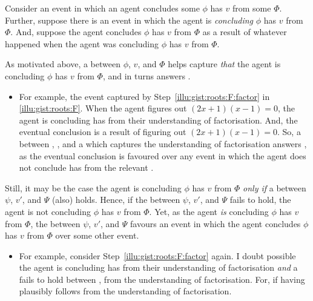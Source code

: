 \begin{note}
  Consider an event in which an agent concludes some  \(\phi\) has \val{} \(v\) from some \pool{} \(\Phi\).
  Further, suppose there is an event in which the agent is \emph{concluding} \(\phi\) has \val{} \(v\) from \(\Phi\).
  And, suppose the agent concludes \(\phi\) has \val{} \(v\) from \(\Phi\) as a result of whatever happened when the agent was concluding \(\phi\) has \val{} \(v\) from \(\Phi\).

  As motivated above, a \ros{} between \(\phi\), \(v\), and \(\Phi\) helps capture \emph{that} the agent is concluding \(\phi\) has  \(v\) from \(\Phi\), and in turns answers \qWhy{}.
  \begin{itemize}
  \item
    For example, the event captured by Step~\ref{illu:gist:roots:F:factor} in \autoref{illu:gist:roots:F}.
    When the agent figures out \((2x + 1)(x - 1) = 0\), the agent is concluding \propI{\rootsCon{}} has   from their understanding of factorisation.
    And, the eventual conclusion is a result of figuring out \((2x + 1)(x - 1) = 0\).
    So, a \ros{} between \propI{\rootsCon{}}, , and a \pool{} which captures the \agents{} understanding of factorisation answers \qWhy{}, as the \agents{} eventual conclusion is favoured over any event in which the agent does not conclude \propI{\rootsCon{}} has   from the relevant \pool{}.
  \end{itemize}
  Still, it may be the case the agent is concluding \(\phi\) has  \(v\) from \(\Phi\) \emph{only if} a \ros{} between \(\psi\), \(v'\), and \(\Psi\) (also) holds.
  Hence, if the \ros{} between \(\psi\), \(v'\), and \(\Psi\) fails to hold, the agent is not concluding \(\phi\) has  \(v\) from \(\Phi\).
  Yet, as the agent \emph{is} concluding \(\phi\) has  \(v\) from \(\Phi\), the \ros{} between \(\psi\), \(v'\), and \(\Psi\) favours an event in which the agent concludes \(\phi\) has  \(v\) from \(\Phi\) over some other event.
  \begin{itemize}
  \item
    For example, consider Step~\ref{illu:gist:roots:F:factor} again.
    I doubt possible the agent is concluding \propI{\rootsCon{}} has   from their understanding of factorisation \emph{and} a \ros{} fails to hold between \propI{\rootsSimp{}},   from the \agents{} understanding of factorisation.
    For, if \propI{\rootsSimp{}} having   plausibly follows from the \agents{} understanding of factorisation.

\end{itemize}
\end{note}

